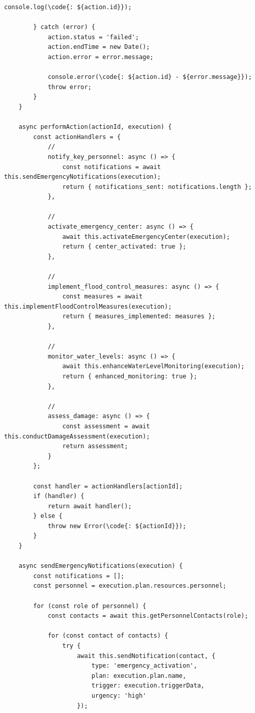 \begin{lstlisting}[style=javascript]
            console.log(\code{: ${action.id}});
            
        } catch (error) {
            action.status = 'failed';
            action.endTime = new Date();
            action.error = error.message;
            
            console.error(\code{: ${action.id} - ${error.message}});
            throw error;
        }
    }
    
    async performAction(actionId, execution) {
        const actionHandlers = {
            // 
            notify_key_personnel: async () => {
                const notifications = await this.sendEmergencyNotifications(execution);
                return { notifications_sent: notifications.length };
            },
            
            // 
            activate_emergency_center: async () => {
                await this.activateEmergencyCenter(execution);
                return { center_activated: true };
            },
            
            // 
            implement_flood_control_measures: async () => {
                const measures = await this.implementFloodControlMeasures(execution);
                return { measures_implemented: measures };
            },
            
            // 
            monitor_water_levels: async () => {
                await this.enhanceWaterLevelMonitoring(execution);
                return { enhanced_monitoring: true };
            },
            
            // 
            assess_damage: async () => {
                const assessment = await this.conductDamageAssessment(execution);
                return assessment;
            }
        };
        
        const handler = actionHandlers[actionId];
        if (handler) {
            return await handler();
        } else {
            throw new Error(\code{: ${actionId}});
        }
    }
    
    async sendEmergencyNotifications(execution) {
        const notifications = [];
        const personnel = execution.plan.resources.personnel;
        
        for (const role of personnel) {
            const contacts = await this.getPersonnelContacts(role);
            
            for (const contact of contacts) {
                try {
                    await this.sendNotification(contact, {
                        type: 'emergency_activation',
                        plan: execution.plan.name,
                        trigger: execution.triggerData,
                        urgency: 'high'
                    });
                    

\end{lstlisting}

